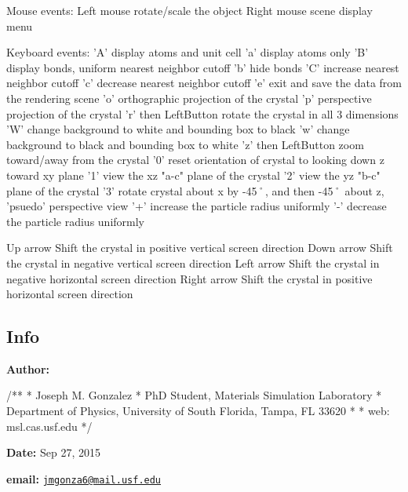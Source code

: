 \begin{DoxyVerb}    Mouse events:
      Left mouse            rotate/scale the object
      Right mouse           scene display menu
  
    Keyboard events:
        'A'                   display atoms and unit cell
        'a'                   display atoms only
        'B'                   display bonds, uniform nearest neighbor cutoff
        'b'                   hide bonds
        'C'                   increase nearest neighbor cutoff
        'c'                   decrease nearest neighbor cutoff
        'e'                   exit and save the data from the rendering scene
        'o'                   orthographic projection of the crystal
        'p'                   perspective projection of the crystal
        'r' then LeftButton   rotate the crystal in all 3 dimensions
        'W'                   change background to white and bounding box to black
        'w'                   change background to black and bounding box to white
        'z' then LeftButton   zoom toward/away from the crystal
        '0'                   reset orientation of crystal to looking down z toward xy plane
        '1'                   view the xz "a-c" plane of the crystal
        '2'                   view the yz "b-c" plane of the crystal
        '3'                   rotate crystal about x by -45˚, and then -45˚ about z, 'psuedo' perspective view
        '+'                   increase the particle radius uniformly
        '-'                   decrease the particle radius uniformly
   
        Up arrow              Shift the crystal in positive vertical screen direction
        Down arrow            Shift the crystal in negative vertical screen direction
        Left arrow            Shift the crystal in negative horizontal screen direction
        Right arrow           Shift the crystal in positive horizontal screen direction
\end{DoxyVerb}
 



\subsection*{Info }

{\bfseries Author\+:} \begin{DoxyVerb}/**
  * Joseph M. Gonzalez
  * PhD Student, Materials Simulation Laboratory
  * Department of Physics, University of South Florida, Tampa, FL 33620
  *
  * web: msl.cas.usf.edu
  */
\end{DoxyVerb}


{\bfseries Date\+:} Sep 27, 2015

{\bfseries email\+:} \href{mailto:jmgonza6@mail.usf.edu}{\tt jmgonza6@mail.\+usf.\+edu} 